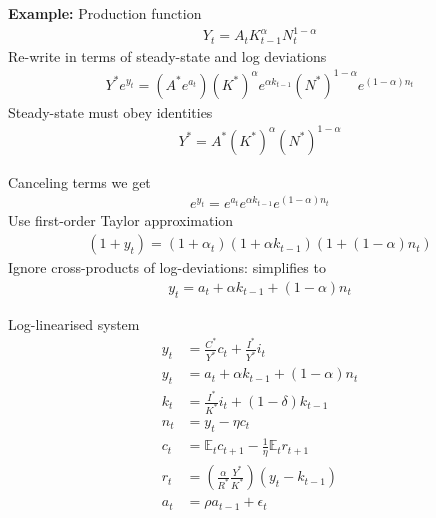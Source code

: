\documentclass{beamer}
\begin{document}
\begin{frame}
  \textbf{Example:} Production function
  \begin{align}
    Y_t=A_tK^{\alpha}_{t-1}N^{1-\alpha}_t 
  \end{align}
  \medskip
  Re-write in terms of steady-state and log deviations
  \begin{align} 
     Y^*e^{y_t} = (A^* e^{a_t}) (K^*)^{\alpha}e^{\alpha k_{t-1}} (N^*)^{1-\alpha}e^{(1-\alpha)n_t}
  \end{align}
  \medskip
  Steady-state must obey identities
  \begin{align} 
    Y^* = A^* (K^*)^{\alpha} (N^*)^{1-\alpha} 
  \end{align}
\end{frame}

\begin{frame}
  Canceling terms we get 
  \begin{align}
    e^{y_t}=e^{a_t}e^{\alpha k_{t-1}}e^{(1-\alpha)n_t} 
  \end{align}
  \medskip
  Use first-order Taylor approximation
\begin{align}
  (1+y_t)=(1+\alpha_t)(1+\alpha k_{t-1})(1+(1-\alpha)n_t)
\end{align}
\medskip
Ignore cross-products of log-deviations: simplifies to
 \begin{align} 
   y_t=a_t+\alpha k_{t-1} + (1-\alpha)n_t 
\end{align}
\end{frame}


\begin{frame}
  Log-linearised system
  \begin{align*}
  y_t &= \frac{C^*}{Y^*}c_t + \frac{I^*}{Y^*}i_t\\
  y_t &= a_t + \alpha k_{t-1} + (1-\alpha)n_t\\
  k_t &= \frac{I^*}{K^*}i_t + (1-\delta)k_{t-1}\\
  n_t &= y_t-\eta c_t\\
  c_t &= \mathbb{E}_tc_{t+1} - \frac{1}{\eta}\mathbb{E}_t r_{t+1}\\
  r_t &= \left(\frac{\alpha}{R^*}\frac{Y^*}{K^*} \right)(y_t-k_{t-1})\\
  a_t &= \rho a_{t-1} + \epsilon_t
 \end{align*}
\end{frame}
\end{document}
